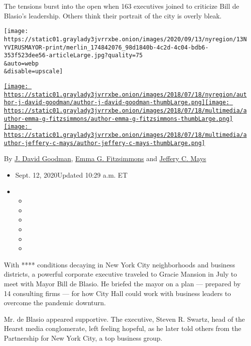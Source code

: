 The tensions burst into the open when 163 executives joined to criticize
Bill de Blasio's leadership. Others think their portrait of the city is
overly bleak.

\texttt{[image: https://static01.graylady3jvrrxbe.onion/images/2020/09/13/nyregion/13NYVIRUSMAYOR-print/merlin\_174842076\_98d1840b-4c2d-4c04-bdb6-353f523dee56-articleLarge.jpg?quality=75\\\&auto=webp\\\&disable=upscale]}

\href{https://www.nytimes3xbfgragh.onion/by/j-david-goodman}{\texttt{[image: https://static01.graylady3jvrrxbe.onion/images/2018/07/18/nyregion/author-j-david-goodman/author-j-david-goodman-thumbLarge.png]}}\href{https://www.nytimes3xbfgragh.onion/by/emma-g-fitzsimmons}{\texttt{[image: https://static01.graylady3jvrrxbe.onion/images/2018/07/18/multimedia/author-emma-g-fitzsimmons/author-emma-g-fitzsimmons-thumbLarge.png]}}\href{https://www.nytimes3xbfgragh.onion/by/jeffery-c-mays}{\texttt{[image: https://static01.graylady3jvrrxbe.onion/images/2018/07/18/multimedia/author-jeffery-c-mays/author-jeffery-c-mays-thumbLarge.png]}}

By \href{https://www.nytimes3xbfgragh.onion/by/j-david-goodman}{J. David
Goodman},
\href{https://www.nytimes3xbfgragh.onion/by/emma-g-fitzsimmons}{Emma G.
Fitzsimmons} and
\href{https://www.nytimes3xbfgragh.onion/by/jeffery-c-mays}{Jeffery C.
Mays}

\begin{itemize}
\item
  Sept. 12, 2020Updated 10:29 a.m. ET
\item
  \begin{itemize}
  \item
  \item
  \item
  \item
  \item
  \item
  \end{itemize}
\end{itemize}

With **** conditions decaying in New York City neighborhoods and
business districts, a powerful corporate executive traveled to Gracie
Mansion in July to meet with Mayor Bill de Blasio. He briefed the mayor
on a plan --- prepared by 14 consulting firms --- for how City Hall
could work with business leaders to overcome the pandemic downturn.

Mr. de Blasio appeared supportive. The executive, Steven R. Swartz, head
of the Hearst media conglomerate, left feeling hopeful, as he later told
others from the Partnership for New York City, a top business group.

